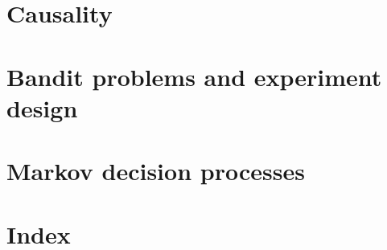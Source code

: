 \documentclass[a4paper,twoside]{book}
\begin{document}
\chapter{Causality}
\label{ch:causality}


\chapter{Bandit problems and experiment design}
\label{ch:bandit}

\chapter{Markov decision processes}
\label{ch:mdp}


\chapter{Index}
\printindex




\end{document}
